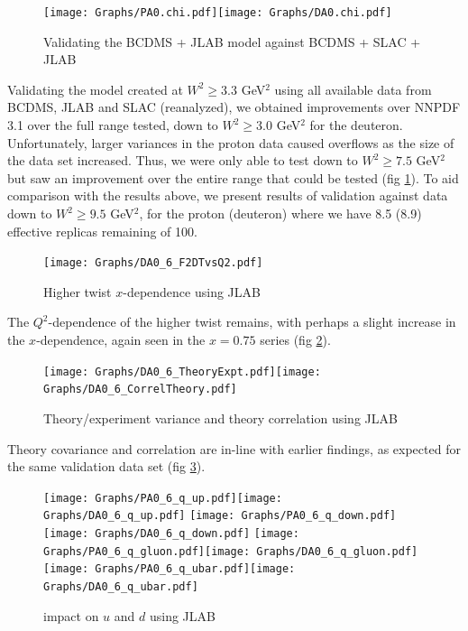 \documentclass[12pt,a4paper]{report}
\begin{document}
\begin{figure}[ht]
\begin{center}
\texttt{[image: Graphs/PA0.chi.pdf]}\texttt{[image: Graphs/DA0.chi.pdf]}\\
\caption{Validating the BCDMS + JLAB model against BCDMS + SLAC + JLAB}
\label{fig:res_validate_JLAB_all}
\end{center}
\end{figure}

Validating the model created at $W^2 \ge 3.3$ GeV$^2$ using all available data from BCDMS, JLAB and SLAC (reanalyzed), we obtained improvements over NNPDF 3.1 over the full range tested, down to $W^2 \ge 3.0$ GeV$^2$ for the deuteron. Unfortunately, larger variances in the proton data caused overflows as the size of the data set increased. Thus, we were only able to test down to $W^2 \ge 7.5$ GeV$^2$ but saw an improvement over the entire range that could be tested (fig \ref{fig:res_validate_JLAB_all}). To aid comparison with the results above, we present results of validation against data down to $W^2 \ge 9.5$ GeV$^2$, for the proton (deuteron) where we have 8.5 (8.9) effective replicas remaining of 100.

\begin{figure}[H]
\begin{center}
\texttt{[image: Graphs/DA0\_6\_F2DTvsQ2.pdf]}
\caption{Higher twist $x$-dependence using JLAB}
\label{fig:res_ht_XQ2_Dep_JLAB}
\end{center}
\end{figure}
The $Q^2$-dependence of the higher twist remains, with perhaps a slight increase in the $x$-dependence, again seen in the $x=0.75$ series (fig \ref{fig:res_ht_XQ2_Dep_JLAB}).

\begin{figure}[H]
\begin{center}
\texttt{[image: Graphs/DA0\_6\_TheoryExpt.pdf]}\texttt{[image: Graphs/DA0\_6\_CorrelTheory.pdf]}
\caption{Theory/experiment variance and theory correlation using JLAB}
\label{fig:res_theory_exp_reanalyzed_JLAB}
\end{center}
\end{figure}
Theory covariance and correlation are in-line with earlier findings, as expected for the same validation data set (fig \ref{fig:res_theory_exp_reanalyzed_JLAB}).

\begin{figure}[H]
\begin{center}
\texttt{[image: Graphs/PA0\_6\_q\_up.pdf]}\texttt{[image: Graphs/DA0\_6\_q\_up.pdf]}
\texttt{[image: Graphs/PA0\_6\_q\_down.pdf]}\texttt{[image: Graphs/DA0\_6\_q\_down.pdf]}
\texttt{[image: Graphs/PA0\_6\_q\_gluon.pdf]}\texttt{[image: Graphs/DA0\_6\_q\_gluon.pdf]}
\texttt{[image: Graphs/PA0\_6\_q\_ubar.pdf]}\texttt{[image: Graphs/DA0\_6\_q\_ubar.pdf]}
\caption{impact on $u$ and $d$ using JLAB}
\label{fig:res_impact_JLAB_a}
\end{center}
\end{figure}
\end{document}
